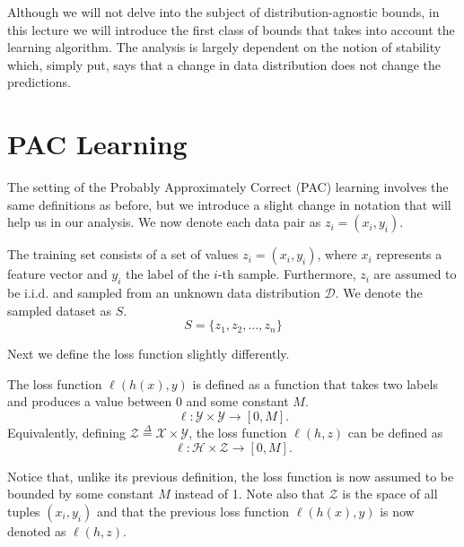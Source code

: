\documentclass{article}
\begin{document}
Although we will not delve into the subject of distribution-agnostic bounds, in this lecture we will introduce the first class of bounds that takes into account the learning algorithm. The analysis is largely dependent on the notion of stability which, simply put, says that a change in data distribution does not change the predictions. 



\section{PAC Learning}
The setting of the Probably Approximately Correct (PAC) learning involves the same definitions as before, but we introduce a slight change in notation that will help us in our analysis. We now denote each data pair as $z_i=(x_i,y_i)$.

\begin{defn}
The training set consists of a set of values $z_i=(x_i,y_i)$, where $x_i$ represents a feature vector and $y_i$ the label of the $i$-th sample. Furthermore, $z_i$ are assumed to be i.i.d. and sampled from an unknown data distribution $\mathcal{D}$. We denote the sampled dataset as $S$. 
\[
	S = \{z_1, z_2, \dots, z_n\}
\]
\end{defn}
 Next we define the loss function slightly differently. 
\begin{defn} The loss function $\ell(h(x),y)$ is defined as a function that takes two labels and produces a value between $0$ and some constant $M$. 
\[
	\ell: \mathcal{Y} \times \mathcal{Y} \longrightarrow [0,M].
\]
Equivalently, defining $\mathcal{Z}\overset{\Delta}{=}\mathcal{X}\times \mathcal{Y}$,  the loss function $\ell (h,z)$  can be defined as 
\[
	\ell: \mathcal{H} \times \mathcal{Z} \longrightarrow [0,M].
\]
\end{defn}
Notice that, unlike its previous definition, the loss function is now assumed to be bounded by some constant $M$ instead of 1. 
Note also that $\mathcal{Z}$ is the space of all tuples $(x_i,y_i) $ and that the previous loss function $\ell(h(x),y)$ is now denoted as $\ell(h,z)$.
\end{document}
